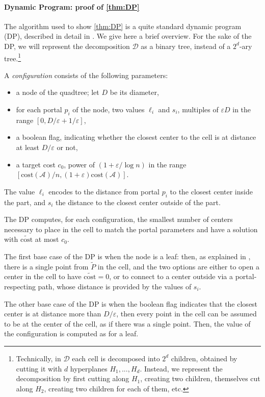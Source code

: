 \documentclass[11pt]{article}
\newcommand{\eps}{\varepsilon}
\newcommand{\cost}{\mathrm{cost}}
\renewcommand{\tilde}{\widetilde}
\newcommand{\calD}{\mathcal {D}}
\newcommand{\calL}{\mathcal{A}}
\newcommand{\lbra}{\left[}
\newcommand{\rbra}{\right]}
\begin{document}
\paragraph*{Dynamic Program: proof of \cref{thm:DP}}

The algorithm used to show \cref{thm:DP} is a quite standard dynamic program (DP), described in detail in \cite{jacm}. We give here a brief overview.
For the sake of the DP, we will represent the decomposition $\calD$ as a binary tree, instead of a $2^d$-ary tree.\footnote{Technically, in $\calD$ each cell is decomposed into $2^d$ children, obtained by cutting it with $d$ hyperplanes $H_1, ..., H_d$. Instead, we represent the decomposition by first cutting along $H_1$, creating two children, themselves cut along $H_2$, creating two children for each of them, etc.}

A \textit{configuration} consists of the following parameters: 
\begin{itemize}
    \item a node of the quadtree; let $D$ be its  diameter,
    \item for each portal $p_i$ of the node, two values $\ell_i$ and $s_i$, multiples of $\eps D$ in the range $\lbra 0, D/\eps + 1/\eps\rbra$,
    \item a boolean flag, indicating whether the closest center to the cell is at distance at least $D/\eps$ or not,
    \item a target cost $c_0$, power of $(1+\eps/\log n)$ in the range $\lbra \cost(\calL)/n, (1+\eps) \cost(\calL) \rbra$.
\end{itemize}
The value $\ell_i$ encodes to the distance from portal $p_i$ to the closest center inside the part, and $s_i$ the distance to the closest center outside of the part.

The DP computes, for each configuration, the smallest number of centers necessary to place in the cell to match the portal parameters and have a solution with $\tilde{\cost}$ at most $c_0$.

The first base case of the DP is when the node is a leaf: then, as explained in \cite{jacm}, there is a single point from $\tilde P$ in the cell, and the two options are either to open a center in the cell to have $\tilde{\cost} = 0$, or to connect to a center outside via a portal-respecting path, whose distance is provided by the values of $s_i$.

The other base case of the DP is when the boolean flag indicates that the closest center is at distance more than $D/\eps$, then every point in the cell can be assumed to be at the center of the cell, as if there was a single point. Then, the value of the configuration is computed as for a leaf.
\end{document}
